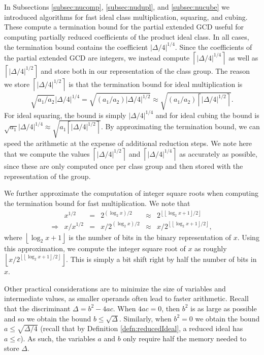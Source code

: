\documentclass{ucalgthes1}
\theoremstyle{definition}
\newcommand{\floor}[1]{\left\lfloor #1 \right\rfloor}
\newcommand{\ceil}[1]{\left\lceil #1 \right\rceil}
\begin{document}
In Subsections \ref{subsec:nucomp}, \ref{subsec:nudupl}, and \ref{subsec:nucube} we introduced algorithms for fast ideal class multiplication, squaring, and cubing.  These compute a termination bound for the partial extended GCD useful for computing partially reduced coefficients of the product ideal class.  In all cases, the termination bound contains the coefficient $|\Delta/4|^{1/4}$.  Since the coefficients of the partial extended GCD are integers, we instead compute $\ceil{|\Delta/4|^{1/4}}$ as well as $\ceil{|\Delta/4|^{1/2}}$ and store both in our representation of the class group.  The reason we store $\ceil{|\Delta/4|^{1/2}}$ is that the termination bound for ideal multiplication is
\[
\sqrt{a_1/a_2}|\Delta/4|^{1/4} = \sqrt{(a_1/a_2) |\Delta/4|^{1/2}} \approx \sqrt{(a_1/a_2) \ceil{|\Delta/4|^{1/2}}}.
\]
For ideal squaring, the bound is simply $|\Delta/4|^{1/4}$ and for ideal cubing the bound is $\sqrt{a_1}|\Delta/4|^{1/4} \approx \sqrt{a_1\ceil{|\Delta/4|^{1/2}}}$. By approximating the termination bound, we can speed the arithmetic at the expense of additional reduction steps. We note here that we compute the values $\ceil{|\Delta/4|^{1/2}}$ and $\ceil{|\Delta/4|^{1/4}}$ as accurately as possible, since these are only computed once per class group and then stored with the representation of the group.

We further approximate the computation of integer square roots when computing the termination bound for fast multiplication.  We note that 
\begin{equation*}
\begin{array}{rrlrlr}
	& x^{1/2} &=& 2^{(\log_2x)/2} &\approx& 2^{\floor{\floor{\log_2x+1}/2}} \\
	\Rightarrow & x / x^{1/2} &=& x / 2^{(\log_2x)/2} &\approx& x / 2^{\floor{\floor{\log_2x+1}/2}},
\end{array}
\end{equation*}
where $\floor{\log_2x+1}$ is the number of bits in the binary representation of $x$.  Using this approximation, we compute the integer square root of $x$ as roughly $\floor{x / 2^{\floor{\floor{\log_2x+1}/2}}}$.  This is simply a bit shift right by half the number of bits in $x$.

Other practical considerations are to minimize the size of variables and intermediate values, as smaller operands often lead to faster arithmetic.  Recall that the discriminant $\Delta = b^2 - 4ac$.  When $4ac=0$, then $b^2$ is as large as possible and so we obtain the bound $b \le \sqrt\Delta$.  Similarly, when $b^2 = 0$ we obtain the bound $a \le \sqrt{\Delta/4}$ (recall that by Definition \ref{defn:reducedIdeal}, a reduced ideal has $a \le c$).  As such, the variables $a$ and $b$ only require half the memory needed to store $\Delta$.
\end{document}
